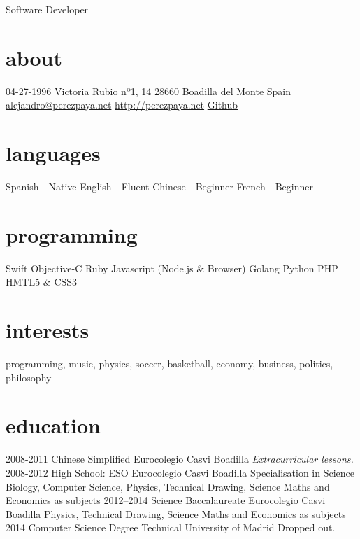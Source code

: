 \documentclass[]{perezpaya-cv}
\begin{document}
       {Software Developer}


\begin{aside}
  \section{about}
  	04-27-1996
    Victoria Rubio nº1, 14
    28660 Boadilla del Monte
    Spain
    ~
    \href{mailto:alejandro@perezpaya.net}{alejandro@perezpaya.net}
    \href{http://perezpaya.net}{http://perezpaya.net}
    \href{http://github.com/alexperezpaya}{Github}
  \section{languages}
    Spanish - Native
    English - Fluent
    Chinese - Beginner
    French  - Beginner
  \section{programming}
	Swift
    Objective-C
    Ruby
    Javascript
    (Node.js \& Browser)
    Golang
    Python
    PHP
    HMTL5 \& CSS3
\end{aside}

\section{interests}
programming, music, physics, soccer, basketball, economy, business, politics, philosophy

\section{education}

\begin{entrylist}
  \entry
    {2008-2011}
    {Chinese Simplified}
    {Eurocolegio Casvi Boadilla}
    {\emph{Extracurricular lessons.}}
  \entry
    {2008-2012}
    {High School: ESO}
    {Eurocolegio Casvi Boadilla}
    {Specialisation in Science\\
    Biology, Computer Science, Physics, Technical Drawing, Science Maths and Economics as subjects}
  \entry
    {2012–2014}
    {Science Baccalaureate}
    {Eurocolegio Casvi Boadilla}
    {Physics, Technical Drawing, Science Maths and Economics as subjects}
  \entry
    {2014}
    {Computer Science Degree}
    {Technical University of Madrid}
    {Dropped out.}
\end{entrylist}
\end{document}
